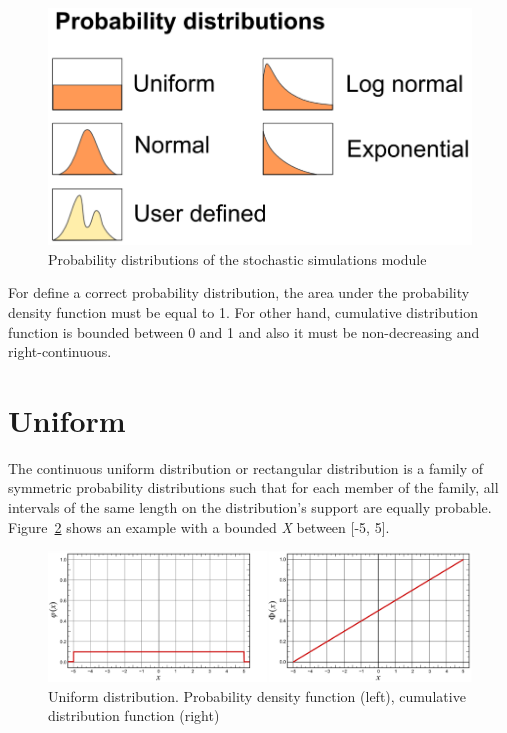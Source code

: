\documentclass[
  letterpaper,
  DIV=11,
  numbers=noendperiod]{scrreprt}
\begin{document}
\begin{figure}

{\centering \includegraphics{./figures/fig-probability_distributions.png}

}

\caption{\label{fig-probability_distributions}Probability distributions
of the stochastic simulations module}

\end{figure}

For define a correct probability distribution, the area under the
probability density function must be equal to 1. For other hand,
cumulative distribution function is bounded between 0 and 1 and also it
must be non-decreasing and right-continuous.

\hypertarget{uniform}{%
\section{Uniform}\label{uniform}}

The continuous uniform distribution or rectangular distribution is a
family of symmetric probability distributions such that for each member
of the family, all intervals of the same length on the distribution's
support are equally probable. Figure~\ref{fig-distribution_uniform}
shows an example with a bounded \emph{X} between {[}-5, 5{]}.

\begin{figure}

{\centering \includegraphics{./figures/fig-distribution_uniform.png}

}

\caption{\label{fig-distribution_uniform}Uniform distribution.
Probability density function (left), cumulative distribution function
(right)}

\end{figure}
\end{document}
